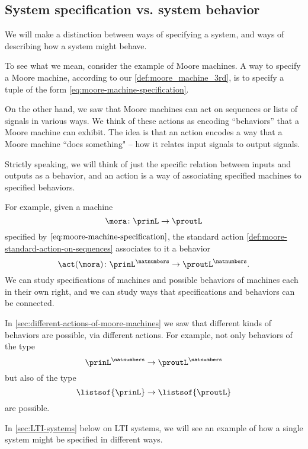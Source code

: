 
\subsection{System specification vs. system behavior}

We will make a distinction between ways of specifying a system, and ways of describing how a system might behave.

To see what we mean, consider the example of Moore machines.
A way to specify a Moore machine, according to our \cref{def:moore_machine_3rd}, is to specify a tuple of the form \cref{eq:moore-machine-specification}.

On the other hand, we saw that Moore machines can act on sequences or lists of signals in various ways.
We think of these actions as encoding ``behaviors'' that a Moore machine can exhibit.
The idea is that an action encodes a way that a Moore machine ``does something" -- how it relates input signals to output signals.

Strictly speaking, we will think of just the specific relation between inputs and outputs as a behavior, and an action is a way of associating specified machines to specified behaviors.


For example, given a machine
\begin{equation*}
    \mora \colon \prinL \to \proutL
\end{equation*}
specified by $\cref{eq:moore-machine-specification}$, the standard action \cref{def:moore-standard-action-on-sequences} associates to it a behavior
\begin{equation*}
    \act(\mora) \colon {\prinL}^\natnumbers \to {\proutL}^\natnumbers.
\end{equation*}
We can study specifications of machines and possible behaviors of machines each in their own right, and we can study ways that specifications and behaviors can be connected.

In \cref{sec:different-actions-of-moore-machines} we saw that different kinds of behaviors are possible, via different actions.
For example, not only behaviors of the type
\begin{equation*}
    {\prinL}^\natnumbers \to {\proutL}^\natnumbers
\end{equation*}
but also of the type
\begin{equation*}
    \listsof{\prinL} \to \listsof{\proutL}
\end{equation*}
are possible.

In \cref{sec:LTI-systems} below on LTI systems, we will see an example of how a single system might be specified in different ways.

